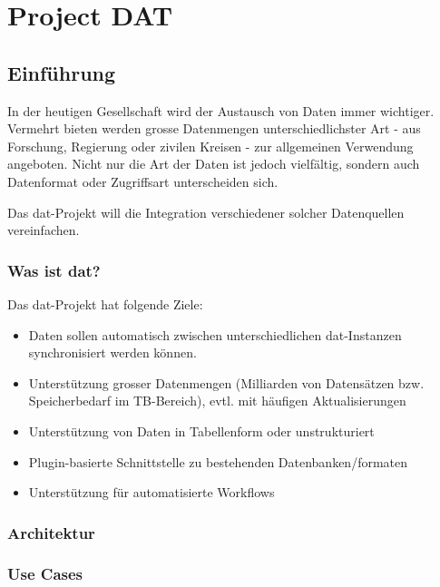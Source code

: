 \part{Project DAT}

\chapter{Einführung}

In der heutigen Gesellschaft wird der Austausch von Daten immer wichtiger. Vermehrt bieten werden grosse Datenmengen unterschiedlichster Art - aus Forschung, Regierung oder zivilen Kreisen - zur allgemeinen Verwendung angeboten. Nicht nur die Art der Daten ist jedoch vielfältig, sondern auch Datenformat oder Zugriffsart unterscheiden sich.

Das \gls{dat}-Projekt will die Integration verschiedener solcher Datenquellen vereinfachen.

\section{Was ist dat?} %

Das dat-Projekt hat folgende Ziele: 

\begin{itemize}
\item Daten sollen automatisch zwischen unterschiedlichen dat-Instanzen synchronisiert werden können. 
\item Unterstützung grosser Datenmengen (Milliarden von Datensätzen bzw. Speicherbedarf im TB-Bereich), evtl. mit häufigen Aktualisierungen
\item Unterstützung von Daten in Tabellenform oder unstrukturiert
\item Plugin-basierte Schnittstelle zu bestehenden Datenbanken/formaten
\item Unterstützung für automatisierte Workflows
\end{itemize}

\section{Architektur}


\section{Use Cases} %

